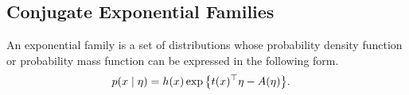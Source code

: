 \documentclass[tablecaption=bottom,wcp]{jmlr} %
\begin{document}

\subsection{Conjugate Exponential Families}
\vspace*{-1.5ex}
An exponential family is a set of distributions whose probability density function or probability mass function can be expressed in the following form.
\begin{align}
\label{eq:cebm-likelihood}
    p(x \mid \eta) 
    &= 
    h(x) \exp \big\{ 
        t(x)^\top \eta   
        - A(\eta) \big\}.
\end{align}
\end{document}

